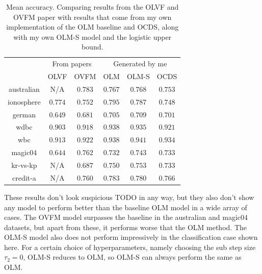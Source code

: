 \begin{table}
  \centering
  \begin{tabular}{c|cc||ccc}
    \multicolumn{1}{l}{} & \multicolumn{2}{c}{From papers} & \multicolumn{3}{c}{Generated by me}                                             \\
                         & OLVF                            & OVFM                                & OLM                & OLM-S      & OCDS    \\
    \hline \hline
    australian           & N/A                             & $0.783$                             & $0.767           $ & $0.768 $   & $0.753$ \\
    ionosphere           & $0.774 $                        & $0.752 $                            & $0.795 $           & $0.787 $   & $0.748$ \\
    german               & $0.649 $                        & $0.681 $                            & $0.705 $           & $0.709 $   & $0.701$ \\
    wdbc                 & $0.903 $                        & $0.918 $                            & $0.938 $           & $0.935 $   & $0.921$ \\
    wbc                  & $0.913 $                        & $0.922 $                            & $0.938 $           & $0.941 $   & $0.934$ \\
    magic04              & $0.644 $                        & $0.762 $                            & $0.732 $           & $0.743 $   & $0.733$ \\
    kr-vs-kp             & N/A                             & $0.687 $                            & $0.750 $           & $0.753  $  & $0.733$ \\
    credit-a             & N/A                             & $0.760 $                            & $0.783  $          & $0.780   $ & $0.766$
  \end{tabular}
  \caption{Mean accuracy. Comparing results from the OLVF and OVFM paper with
    results that come from my own implementation of the OLM baseline and OCDS,
    along with my own OLM-S model and the logistic upper bound.}
  \label{tab:classif_results}
\end{table}

These results don't look suspicious TODO in any way, but they also don't show
any model to perform better than the baseline OLM model in a wide array of
cases. The OVFM model surpasses the baseline in the australian and magic04
datasets, but apart from these, it performs worse that the OLM method. The
OLM-S model also does not perform impressively in the classification case shown
here. For a certain choice of hyperparameters, namely choosing the sub step
size $\tau_2 = 0$, OLM-S reduces to OLM, so OLM-S can always perform the same
as OLM.


